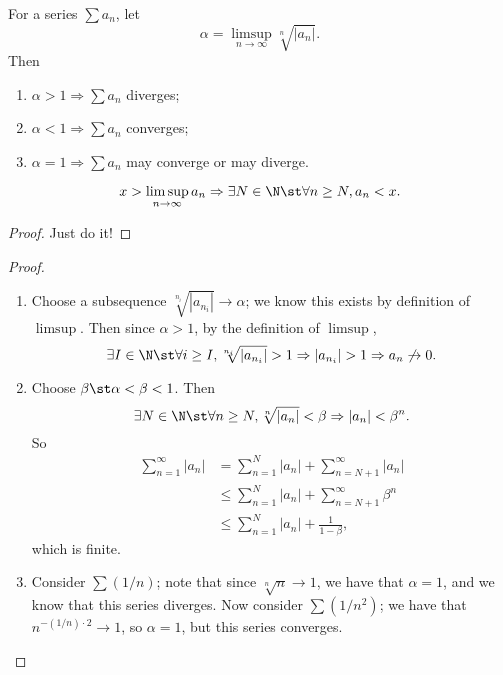 \documentclass{notes}
\begin{document}
\begin{theorem}
  For a series $\sum a_n$, let $$\alpha = \limsup_{n\to\infty} \sqrt[n]{|a_n|}.$$ Then 
  \begin{enumerate}
    \item $\alpha > 1 \Rightarrow \sum a_n$ diverges; 
    \item $\alpha < 1 \Rightarrow \sum a_n$ converges;
    \item $\alpha = 1 \Rightarrow \sum a_n$ may converge or may diverge.
  \end{enumerate}
\end{theorem}

\begin{lemma}
  $$x > \limsup_{n\to\infty} a_n \Rightarrow \exists N\in\N \st \forall n \geq N, a_n < x.$$
\end{lemma}
\begin{proof}
  Just do it!
\end{proof}

\begin{proof}\leavevmode
 \begin{enumerate}
   \item Choose a subsequence $\sqrt[n_i]{|a_{n_i}|} \to \alpha$; we know this exists by definition of 
     $\limsup.$ Then since $\alpha > 1$, by the definition of $\limsup$, $$\exists I\in\N \st \forall 
     i \geq I, \sqrt[n_i]{|a_{n_i}|} > 1 \Rightarrow |a_{n_i}| > 1 \Rightarrow a_n \not\to 0.$$

   \item Choose $\beta \st \alpha < \beta < 1$. Then 
       $$\exists N\in\N \st \forall n \geq N, \sqrt[n]{|a_n|} < \beta \Rightarrow |a_n| < \beta^n.$$
       So 
       \begin{align*}
         \sum_{n=1}^\infty |a_n| &= \sum_{n=1}^N |a_n| + \sum_{n=N+1}^\infty |a_n| \\
                                 &\leq \sum_{n=1}^N |a_n| + \sum_{n=N+1}^\infty \beta^n \\
                                 &\leq \sum_{n=1}^N |a_n| + \frac{1}{1-\beta},
       \end{align*}
       which is finite.

   \item Consider $\sum (1/n)$; note that since $\sqrt[n]{n} \to 1$, we have that $\alpha = 1$, and we 
   know that this series diverges. Now consider $\sum (1/n^2)$; we have that $n^{-(1/n) \cdot 2} \to 1$,
   so $\alpha = 1$, but this series converges.
 \end{enumerate} 
\end{proof}
\end{document}
